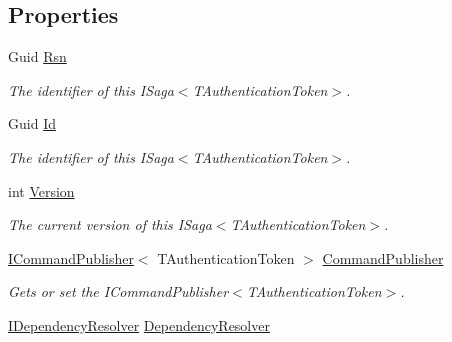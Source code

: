 \subsection*{Properties}
\begin{DoxyCompactItemize}
\item 
Guid \hyperlink{classCqrs_1_1Domain_1_1Saga_a2a7053e3d31629aa8a25cb38a238aca5_a2a7053e3d31629aa8a25cb38a238aca5}{Rsn}
\begin{DoxyCompactList}\small\item\em The identifier of this I\+Saga$<$\+T\+Authentication\+Token$>$. \end{DoxyCompactList}\item 
Guid \hyperlink{classCqrs_1_1Domain_1_1Saga_af6b9552a90fcbe5c101c413126256565_af6b9552a90fcbe5c101c413126256565}{Id}
\begin{DoxyCompactList}\small\item\em The identifier of this I\+Saga$<$\+T\+Authentication\+Token$>$. \end{DoxyCompactList}\item 
int \hyperlink{classCqrs_1_1Domain_1_1Saga_a581e88da4e3e76d3704586f97866a7a6_a581e88da4e3e76d3704586f97866a7a6}{Version}
\begin{DoxyCompactList}\small\item\em The current version of this I\+Saga$<$\+T\+Authentication\+Token$>$. \end{DoxyCompactList}\item 
\hyperlink{interfaceCqrs_1_1Commands_1_1ICommandPublisher}{I\+Command\+Publisher}$<$ T\+Authentication\+Token $>$ \hyperlink{classCqrs_1_1Domain_1_1Saga_a944fc264b716dcd60a2e51c9897766fa_a944fc264b716dcd60a2e51c9897766fa}{Command\+Publisher}
\begin{DoxyCompactList}\small\item\em Gets or set the I\+Command\+Publisher$<$\+T\+Authentication\+Token$>$. \end{DoxyCompactList}\item 
\hyperlink{interfaceCqrs_1_1Configuration_1_1IDependencyResolver}{I\+Dependency\+Resolver} \hyperlink{classCqrs_1_1Domain_1_1Saga_afd8b9bae392272e1651f2ea53c65db12_afd8b9bae392272e1651f2ea53c65db12}{Dependency\+Resolver}

\end{DoxyCompactItemize}
